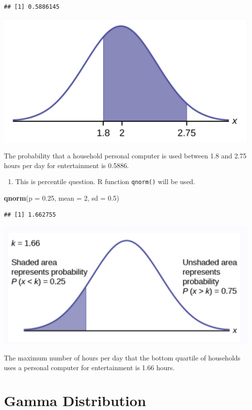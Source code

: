 \documentclass[
]{book}
\newenvironment{Shaded}{\begin{snugshade}}{\end{snugshade}}
\newcommand{\AttributeTok}[1]{\textcolor[rgb]{0.13,0.29,0.53}{#1}}
\newcommand{\DecValTok}[1]{\textcolor[rgb]{0.00,0.00,0.81}{#1}}
\newcommand{\FloatTok}[1]{\textcolor[rgb]{0.00,0.00,0.81}{#1}}
\newcommand{\FunctionTok}[1]{\textcolor[rgb]{0.13,0.29,0.53}{\textbf{#1}}}
\newcommand{\NormalTok}[1]{#1}
\providecommand{\tightlist}{%
  \setlength{\itemsep}{0pt}\setlength{\parskip}{0pt}}
\begin{document}
\begin{verbatim}
## [1] 0.5886145
\end{verbatim}

\begin{center}\includegraphics[width=0.4\linewidth]{topic03/example6-1} \end{center}

The probability that a household personal computer is used between 1.8 and 2.75 hours per day for entertainment is 0.5886.

\begin{enumerate}
\def\labelenumi{\arabic{enumi}.}
\setcounter{enumi}{1}
\tightlist
\item
  This is percentile question. R function \texttt{qnorm()} will be used.
\end{enumerate}

\begin{Shaded}
\begin{Highlighting}[]
\FunctionTok{qnorm}\NormalTok{(}\AttributeTok{p =} \FloatTok{0.25}\NormalTok{, }\AttributeTok{mean =} \DecValTok{2}\NormalTok{, }\AttributeTok{sd =} \FloatTok{0.5}\NormalTok{)}
\end{Highlighting}
\end{Shaded}

\begin{verbatim}
## [1] 1.662755
\end{verbatim}

\begin{center}\includegraphics[width=0.4\linewidth]{topic03/example6-2} \end{center}

The maximum number of hours per day that the bottom quartile of households uses a personal computer for entertainment is 1.66 hours.

\hfill\break

\hypertarget{gamma-distribution}{%
\section{Gamma Distribution}\label{gamma-distribution}}
\end{document}
